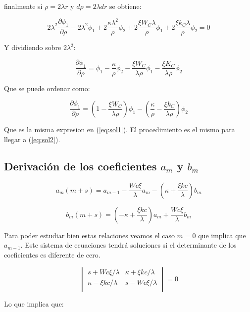 \documentclass[a4paper, 12pt]{article} %
\begin{document}
finalmente si $\rho = 2\lambda r$ y $d\rho = 2 \lambda dr$ se obtiene:

\[
2\lambda^2 \dfrac{\partial \phi_1}{\partial \rho} - 2\lambda^2 \phi_1 + 2 \dfrac{\kappa \lambda^2 }{\rho} \phi_2 
+ 2 \dfrac{\xi W_C \lambda}{\rho}\phi_1 + 2\dfrac{\xi k_C \lambda }{\rho}\phi_2 = 0
\]

Y dividiendo sobre $2\lambda^2$:

\[
\dfrac{\partial \phi_1}{\partial \rho} = \phi_1 - \dfrac{\kappa}{\rho}\phi_2 - \dfrac{\xi W_C}{\lambda \rho }\phi_1 - \dfrac{\xi K_C}{\lambda \rho}
\phi_2 
\]

Que se puede ordenar como:

\begin{equation}
\dfrac{\partial \phi_1}{\partial \rho} = \left( 1 - \dfrac{\xi W_C}{\lambda \rho} \right) \phi_1 
- \left( \dfrac{\kappa}{\rho} - \dfrac{\xi k_C}{\lambda \rho} \right) \phi_2
\end{equation}

Que es la misma expresion en (\ref{eq:sol1}). El procedimiento es el mismo para llegar a (\ref{eq:sol2}).

\subsection{Derivaci\'on de los coeficientes $a_m$ y $b_m$}

\begin{equation}\label{eq:am}
a_m(m+s) = a_{m-1} - \dfrac{Wc\xi}{\lambda}a_m - \left(\kappa + \dfrac{\xi kc}{\lambda}\right) b_m
\end{equation}

\begin{equation}\label{eq:bm}
b_m(m+s) = \left( -\kappa + \dfrac{\xi kc}{\lambda}  \right)a_m + \dfrac{Wc \xi}{\lambda}b_m
\end{equation}

Para poder estudiar bien estas relaciones veamos el caso $m=0$ que implica que $a_{m-1}$. Este 
sistema de ecuaciones tendr\'a soluciones si el determinante de los coeficientes es diferente de
cero. 

\[
\begin{vmatrix}
s + Wc \xi/\lambda & \kappa + \xi kc/\lambda \\
\kappa - \xi kc/\lambda & s-Wc \xi/\lambda \\
\end{vmatrix}
= 0
\]

Lo que implica que:
\end{document}
